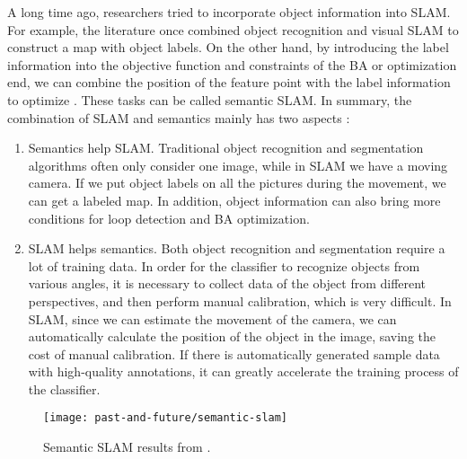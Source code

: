 A long time ago, researchers tried to incorporate object information into SLAM. For example, the literature \cite{Nuechter2008, Civera2011, Koppula2011, Anand2012} once combined object recognition and visual SLAM to construct a map with object labels. On the other hand, by introducing the label information into the objective function and constraints of the BA or optimization end, we can combine the position of the feature point with the label information to optimize {\cite{Fioraio2013}}. These tasks can be called semantic SLAM. In summary, the combination of SLAM and semantics mainly has two aspects {\cite{Cadena2016}}:

\begin{enumerate}
	\item Semantics help SLAM. Traditional object recognition and segmentation algorithms often only consider one image, while in SLAM we have a moving camera. If we put object labels on all the pictures during the movement, we can get a labeled map. In addition, object information can also bring more conditions for loop detection and BA optimization.
	\item SLAM helps semantics. Both object recognition and segmentation require a lot of training data. In order for the classifier to recognize objects from various angles, it is necessary to collect data of the object from different perspectives, and then perform manual calibration, which is very difficult. In SLAM, since we can estimate the movement of the camera, we can automatically calculate the position of the object in the image, saving the cost of manual calibration. If there is automatically generated sample data with high-quality annotations, it can greatly accelerate the training process of the classifier.
\end{enumerate}

\begin{figure}[!thp]
	\centering
	\texttt{[image: past-and-future/semantic-slam]}
	\caption{Semantic SLAM results from \cite{Anand2012, Salas-Moreno2014}.}
	\label{fig:semantic-slam}
\end{figure}

